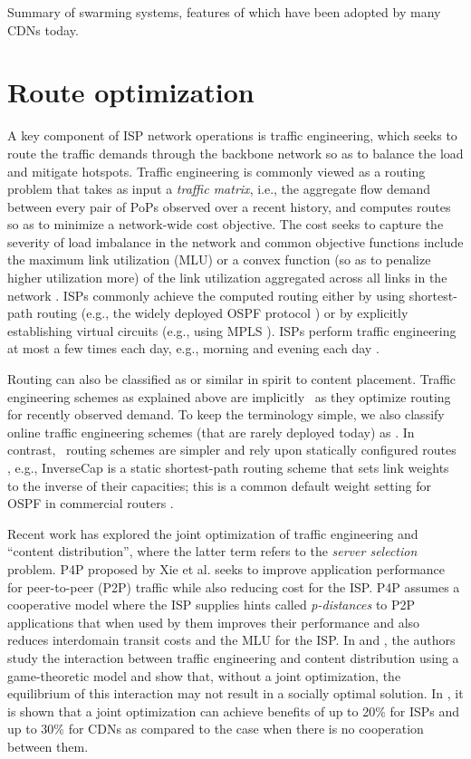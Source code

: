 Summary of swarming systems, features of which have been adopted by many CDNs today.

\section{Route optimization} 
A key component of ISP network operations is traffic engineering, which seeks to route the traffic demands through the backbone network so as to balance the load and mitigate hotspots. Traffic engineering is commonly viewed as a routing problem that takes as input a {\em traffic matrix}, i.e., the aggregate flow demand between every pair of PoPs observed over a recent history, and computes routes so as to minimize a network-wide cost objective. The cost seeks to capture the severity of load imbalance in the network and common objective functions include the maximum link utilization (MLU) or a convex function (so as to penalize higher utilization more) of the link utilization aggregated across all links in the network \cite{fortz2000internet}. ISPs commonly achieve the computed routing either by using shortest-path routing (e.g., the widely deployed OSPF protocol \cite{fortz2000internet}) or by explicitly establishing virtual circuits (e.g., using MPLS \cite{MPLS2}). ISPs perform traffic engineering at most a few times each day, e.g., morning and evening each day \cite{InvCap}.

Routing can also be classified as {\em \planned} or {\em \unplanned} similar in spirit to content placement. Traffic engineering schemes as explained above are implicitly \planned\ as they optimize routing for recently observed demand. To keep the terminology simple, we also classify online traffic engineering schemes \cite{TEXCP,MPLS2} (that are rarely deployed today) as \planned. In contrast, \unplanned\ routing schemes are simpler and rely upon statically configured routes \cite{Cohen,Racke}, e.g., InverseCap is a static shortest-path routing scheme that sets link weights to the inverse of their capacities; this is a common default weight setting for OSPF in commercial routers \cite{InvCap}.


Recent work has explored the joint optimization of traffic engineering and ``content distribution'', where the latter term refers to the {\em server selection} problem.
P4P proposed by Xie et al.  \cite{P4P} seeks to improve application performance for peer-to-peer (P2P) traffic while also reducing cost for the ISP. P4P assumes a cooperative model where the ISP supplies hints called {\em p-distances} to P2P applications that when used by them improves their performance and also reduces interdomain transit costs and the MLU for the ISP. In  \cite{Jiang2009} and  \cite{JohariGameTheory}, the authors study the interaction between traffic engineering and content distribution using a game-theoretic model and show that, without a joint optimization, the equilibrium of this interaction may not result in a socially optimal solution. In  \cite{Jiang2009}, it is shown that a joint optimization can achieve benefits of up to 20\% for ISPs and up to 30\% for CDNs as compared to the case when there is no cooperation between them. 


